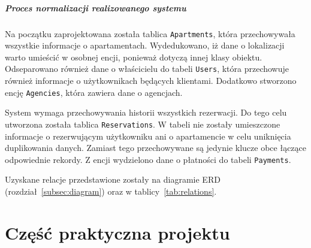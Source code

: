 \documentclass[polish, 11pt]{article}
\begin{document}
    \subparagraph{Proces normalizacji realizowanego systemu\\}
        Na początku zaprojektowana została tablica \verb|Apartments|, która przechowywała wszystkie informacje o apartamentach.
        Wydedukowano, iż dane o lokalizacji warto umieścić w osobnej encji, ponieważ dotyczą innej klasy obiektu.
        Odseparowano również dane o właścicielu do tabeli \verb|Users|, która przechowuje również informacje o użytkownikach będących klientami.
        Dodatkowo stworzono encję \verb|Agencies|, która zawiera dane o agencjach.

        System wymaga przechowywania historii wszystkich rezerwacji.
        Do tego celu utworzona została tablica \verb|Reservations|.
        W tabeli nie zostały umieszczone informacje o rezerwującym użytkowniku ani o apartamencie w celu uniknięcia duplikowania danych.
        Zamiast tego przechowywane są jedynie klucze obce łączące odpowiednie rekordy.
        Z encji wydzielono dane o płatności do tabeli \verb|Payments|.

        Uzyskane relacje przedstawione zostały na diagramie ERD (rozdział~\ref{subsec:diagram}) oraz w tablicy~\ref{tab:relations}.

\section{Część praktyczna projektu}
\end{document}
